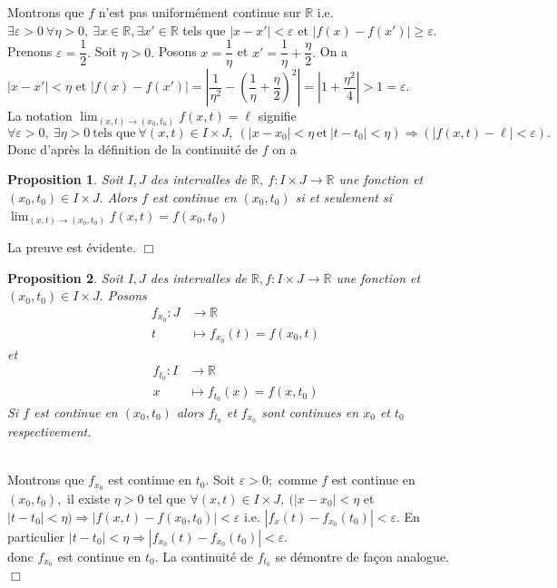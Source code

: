 \documentclass[11pt, a4paper]{book}
\newtheorem{pro}{Proposition}[section]
\newenvironment{pr}{\noindent {\bf Preuve} \noindent} {\hfill $\Box$\vskip 5mm}
\begin{document}
Montrons que $f$ n'est pas uniform\'ement continue sur $\mathbb{R}$ i.e. $\exists \varepsilon>0~\forall \eta>0,~\exists x\in \mathbb{R},\exists x'\in \mathbb{R}$ tels que $|x-x'|<\varepsilon$ et $|f(x)-f(x')|\geq\varepsilon.$ Prenons $\varepsilon=\dfrac{1}{2}.$ Soit $\eta>0.$ Posons $x=\dfrac{1}{\eta}$ et $x'=\dfrac{1}{\eta}+\dfrac{\eta}{2}.$ On a \\
$|x-x'|<\eta$ et $|f(x)-f(x')|=|\dfrac{1}{\eta^2}-(\dfrac{1}{\eta}+\dfrac{\eta}{2})^2|=|1+\dfrac{\eta^2}{4}|>1=\varepsilon.$ \\
La notation ${\displaystyle\lim_{(x,t)\rightarrow(x_0,t_0)}f(x,t)=\ell}$ signifie $$ \forall \varepsilon>0,~\exists \eta>0~\text{tels que}~\forall (x,t)\in I\times J,~(|x-x_0|<\eta~\text{et}~|t-t_0|<\eta)\Rightarrow(|f(x,t)-\ell|<\varepsilon).$$ Donc d'apr\`es la d\'efinition de la continuit\'e de $f$ on a 
\begin{pro} \label{pro6.2.1} Soit $I,J$ des intervalles de $\mathbb{R},~f:I\times J\rightarrow\mathbb{R}$ une fonction et $(x_0,t_0)\in I\times J.$ Alors $f$ est continue en $(x_0,t_0) $ si et seulement si ${\displaystyle\lim_{(x,t)\rightarrow(x_0,t_0)}f(x,t)=f(x_0,t_0)}$
\end{pro}
\begin{pr}\quad
La preuve est \'evidente.
\end{pr}
\begin{pro}	\label{pro6.2.2} Soit $I,J$ des intervalles de $\mathbb{R},f:I\times J\rightarrow\mathbb{R}$ une fonction et $(x_0,t_0)\in I\times J.$ Posons \begin{align*}
f_{x_0}:J&\rightarrow\mathbb{R}\\ t&\mapsto f_{x_0}(t)=f(x_0,t)
\end{align*} 
et \begin{align*}
f_{t_0}:I&\rightarrow\mathbb{R}\\x&\mapsto f_{t_0}(x)=f(x,t_0)
\end{align*}
Si $f$ est continue en $(x_0,t_0)$ alors $f_{t_0}$ et $f_{x_0}$ sont continues en $x_0$ et $t_0$ respectivement.
\end{pro}
\begin{pr}\\
Montrons que $f_{x_0}$ est continue en $t_0.$ Soit $\varepsilon>0;$ comme $f$ est continue en $(x_0,t_0),$ il existe $\eta>0$ tel que $\forall (x,t)\in I\times J,~(|x-x_0|<\eta $	et $|t-t_0|<\eta)\Rightarrow|f(x,t)-f(x_0,t_0)|<\varepsilon$ i.e. $|f_x(t)-f_{x_0}(t_0)|<\varepsilon.$ En particulier $|t-t_0|<\eta \Rightarrow|f_{x_0}(t)-f_{x_0}(t_0)|<\varepsilon.$\\
donc $f_{x_0}$ est continue en $t_0$. La continuit\'e de $f_{t_0}$ se d\'emontre de fa\c{c}on analogue.
\end{pr}
\end{document}
